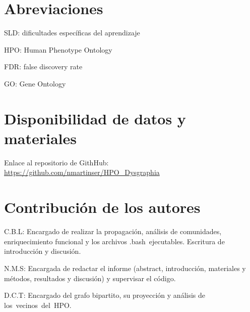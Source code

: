 \documentclass{bmcart}
\begin{document}
	\begin{backmatter}
	
		\section*{Abreviaciones}%
			SLD: dificultades específicas del aprendizaje
			
			HPO: Human Phenotype Ontology
			
			FDR: false discovery rate
			
			GO: Gene Ontology
		
		\section*{Disponibilidad de datos y materiales}%
			Enlace al repositorio de GithHub: \url{https://github.com/nmartinser/HPO_Dysgraphia}
		
		\section*{Contribución de los autores}
			
			C.B.L: Encargado de realizar la propagación, análisis de comunidades, enriquecimiento funcional y los archivos .bash ejecutables. Escritura de introducción y discusión.
			
			N.M.S: Encargada de redactar el informe (abstract, introducción, materiales y métodos, resultados y discusión) y supervisar el código.
			
			D.C.T: Encargado del grafo bipartito, su proyección y análisis de los vecinos del HPO.			 
		
		
		
	
	\end{backmatter}
\end{document}
